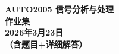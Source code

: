 \thispagestyle{empty}
\begin{center}
    \vspace*{3cm}
    \Huge{\textbf{AUTO2005 信号分析与处理}}\\
    \vspace{1cm}
    \Huge{\textbf{作业集}}\\
    \vspace{1.5cm}
    \Large{\textbf{2026年3月23日}}\\
    \vspace{5cm}
    \Large{\textbf{（含题目+详细解答）}}
\end{center}
\newpage